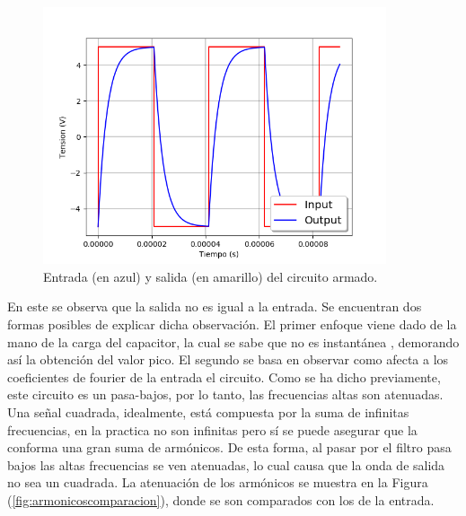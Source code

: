 \documentclass[a4paper]{article}
\begin{document}
\begin{figure}[H]
	\centering
	\includegraphics[width=0.9\textwidth]{Entrada-Salida.png}
\caption{Entrada (en azul) y salida (en amarillo) del circuito armado.}
	\label{fig:simu2}
\end{figure}

En este se observa que la salida no es igual a la entrada. Se encuentran dos formas posibles de explicar dicha observación. El primer enfoque viene dado de la mano de la carga del capacitor, la cual se sabe que no es instantánea , demorando así la obtención del valor pico. El segundo se basa en observar como afecta a los coeficientes de fourier de la entrada el circuito. Como se ha dicho previamente, este circuito es un pasa-bajos, por lo tanto, las frecuencias altas son atenuadas. Una señal cuadrada, idealmente, está compuesta por la suma de infinitas frecuencias, en la practica no son infinitas pero sí se puede asegurar que la conforma una gran suma de armónicos. De esta forma, al pasar por el filtro pasa bajos las altas frecuencias se ven atenuadas, lo cual  causa que la onda de salida no sea un cuadrada. La atenuación de los armónicos se muestra en la Figura (\ref{fig:armonicoscomparacion}), donde se son comparados con los de la entrada.
\end{document}
